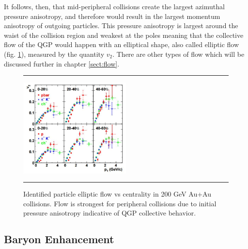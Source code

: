 It follows, then, that mid-peripheral collisions create the largest azimuthal pressure anisotropy, and therefore would result in the largest momentum anisotropy of outgoing particles. This pressure anisotropy is largest around the waist of the collision region and weakest at the poles meaning that the collective flow of the QGP would happen with an elliptical shape, also called elliptic flow (fig. \ref{fig:v2auau}), measured by the quantity $v_2$. There are other types of flow which will be discussed further in chapter \ref{sect:flow}.
    
\begin{figure}[htbp]
\centering 	\rule{35em}{0.5pt}
    \includegraphics[width=0.5\textwidth]{prevplots/v2auau.jpg}

	\caption[Identified particle elliptic flow vs centrality in 200 GeV Au+Au collisions]{Identified particle elliptic flow vs centrality in 200 GeV Au+Au collisions. Flow is strongest for peripheral collisions due to initial pressure anisotropy indicative of QGP collective behavior. \citep{Adler:2003kt}}
\label{fig:v2auau}	\rule{35em}{0.5pt}
\end{figure}

\subsection{Baryon Enhancement}

